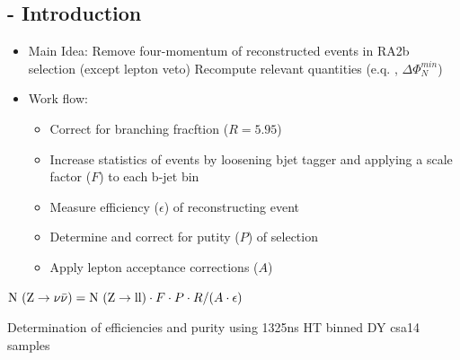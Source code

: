 \documentclass{beamer}
\begin{document}
\subsection{\Zll - Introduction}
\begin{frame}
\begin{itemize}
 \item Main Idea: Remove four-momentum of reconstructed \Zll events in RA2b selection (except lepton veto) Recompute relevant quantities (e.q. \met, $\Delta\Phi_{N}^{min}$)
 \item Work flow:
 \begin{itemize}
  \item Correct for branching fracftion ($R = 5.95$)
  \item Increase statistics of \Zll events by loosening bjet tagger and applying a scale factor ($F$) to each b-jet bin
  \item Measure efficiency ($\epsilon$) of reconstructing \Zll event
  \item Determine and correct for putity ($P$) of \Zll selection
  \item Apply lepton acceptance corrections ($A$)
 \end{itemize}
\end{itemize}
  \begin{centering}
  $\text{N }(\text{Z}\rightarrow\nu\bar{\nu}) = \text{N }(\text{Z}\rightarrow\text{ll})\cdot F \cdot P \cdot R / (A\cdot \epsilon)$
  \end{centering}
  \begin{block}{}
\centering
Determination of \Zll efficiencies and purity using 13\tev 25ns HT binned DY csa14 samples
\end{block}
\end{frame}

\end{document}
